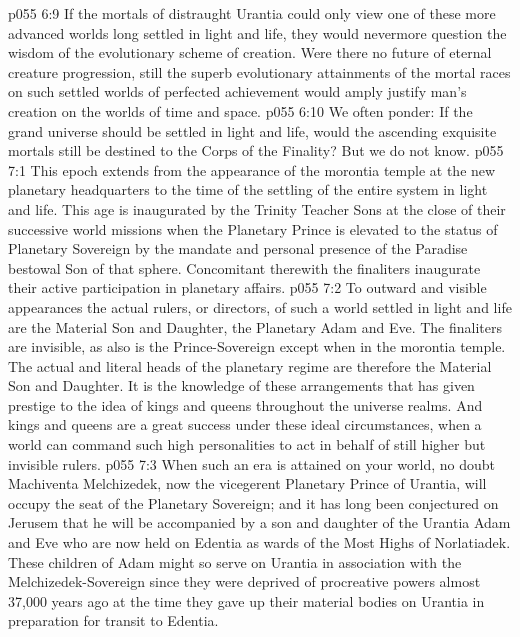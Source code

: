 \vs p055 6:9 If the mortals of distraught Urantia could only view one of these more advanced worlds long settled in light and life, they would nevermore question the wisdom of the evolutionary scheme of creation. Were there no future of eternal creature progression, still the superb evolutionary attainments of the mortal races on such settled worlds of perfected achievement would amply justify man’s creation on the worlds of time and space.
\vs p055 6:10 We often ponder: If the grand universe should be settled in light and life, would the ascending exquisite mortals still be destined to the Corps of the Finality? But we do not know.
%
\vs p055 7:1 This epoch extends from the appearance of the morontia temple at the new planetary headquarters to the time of the settling of the entire system in light and life. This age is inaugurated by the Trinity Teacher Sons at the close of their successive world missions when the Planetary Prince is elevated to the status of Planetary Sovereign by the mandate and personal presence of the Paradise bestowal Son of that sphere. Concomitant therewith the finaliters inaugurate their active participation in planetary affairs.
\vs p055 7:2 To outward and visible appearances the actual rulers, or directors, of such a world settled in light and life are the Material Son and Daughter, the Planetary Adam and Eve. The finaliters are invisible, as also is the Prince\hyp{}Sovereign except when in the morontia temple. The actual and literal heads of the planetary regime are therefore the Material Son and Daughter. It is the knowledge of these arrangements that has given prestige to the idea of kings and queens throughout the universe realms. And kings and queens are a great success under these ideal circumstances, when a world can command such high personalities to act in behalf of still higher but invisible rulers.\plusone
\vs p055 7:3 When such an era is attained on your world, no doubt Machiventa Melchizedek, now the vicegerent Planetary Prince of Urantia, will occupy the seat of the Planetary Sovereign; and it has long been conjectured on Jerusem that he will be accompanied by a son and daughter of the Urantia Adam and Eve who are now held on Edentia as wards of the Most Highs of Norlatiadek. These children of Adam might so serve on Urantia in association with the Melchizedek\hyp{}Sovereign since they were deprived of procreative powers almost 37,000 years ago at the time they gave up their material bodies on Urantia in preparation for transit to Edentia.
